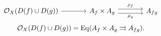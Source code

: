 \[
\begin{tikzcd}[column sep=large]
\OO_X(D(f)\cup D(g)) \arrow[r] & A_f\times A_g
\arrow[r,shift left=.7ex,"\rho_f"]
\arrow[r,shift right=.7ex,"\rho_g"'] & A_{fg}
\end{tikzcd}
\]
\[
\mathcal O_X(D(f)\cup D(g))=\operatorname{Eq}(A_f\times A_g\rightrightarrows A_{fg}).
\]
